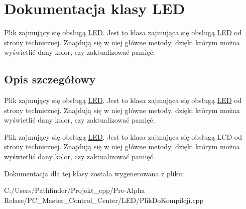 \hypertarget{class_l_e_d}{}\section{Dokumentacja klasy L\+ED}
\label{class_l_e_d}


Plik zajmujący się obsługą \hyperlink{class_l_e_d}{L\+ED}. Jest to klasa zajmująca się obsługą \hyperlink{class_l_e_d}{L\+ED} od strony technicznej. Znajdują się w niej główne metody, dzięki którym można wyświetlić dany kolor, czy zaktualizować pamięć.  




\subsection{Opis szczegółowy}
Plik zajmujący się obsługą \hyperlink{class_l_e_d}{L\+ED}. Jest to klasa zajmująca się obsługą \hyperlink{class_l_e_d}{L\+ED} od strony technicznej. Znajdują się w niej główne metody, dzięki którym można wyświetlić dany kolor, czy zaktualizować pamięć. 

Plik zajmujący się obsługą \hyperlink{class_l_e_d}{L\+ED}. Jest to klasa zajmująca się obsługą L\+CD od strony technicznej. Znajdują się w niej główne metody, dzięki którym można wyświetlić dany kolor, czy zaktualizować pamięć. 

Dokumentacja dla tej klasy została wygenerowana z pliku\+:\begin{DoxyCompactItemize}
\item 
C\+:/\+Users/\+Pathfinder/\+Projekt\+\_\+cpp/\+Pre-\/\+Alpha Relase/\+P\+C\+\_\+\+Master\+\_\+\+Control\+\_\+\+Center/\+L\+E\+D/Plik\+Do\+Kompilcji.\+cpp\end{DoxyCompactItemize}

